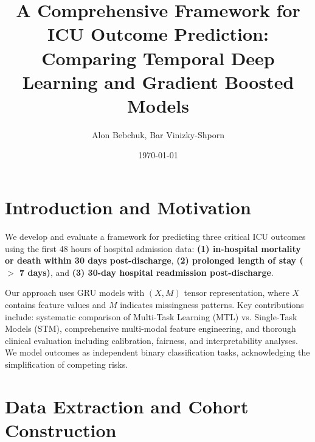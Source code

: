 \documentclass[11pt, a4paper]{article}
\title{A Comprehensive Framework for ICU Outcome Prediction: Comparing Temporal Deep Learning and Gradient Boosted Models}
\author{Alon Bebchuk, Bar Vinizky-Shporn}
\date{\today}
\begin{document}
\maketitle
\thispagestyle{empty}

\section{Introduction and Motivation}
We develop and evaluate a framework for predicting three critical ICU outcomes using the first 48 hours of hospital admission data: \textbf{(1) in-hospital mortality or death within 30 days post-discharge}, \textbf{(2) prolonged length of stay ($>$ 7 days)}, and \textbf{(3) 30-day hospital readmission post-discharge}.

Our approach uses GRU models with $(X, M)$ tensor representation, where $X$ contains feature values and $M$ indicates missingness patterns. Key contributions include: systematic comparison of Multi-Task Learning (MTL) vs. Single-Task Models (STM), comprehensive multi-modal feature engineering, and thorough clinical evaluation including calibration, fairness, and interpretability analyses. We model outcomes as independent binary classification tasks, acknowledging the simplification of competing risks.

\section{Data Extraction and Cohort Construction}
\end{document}
